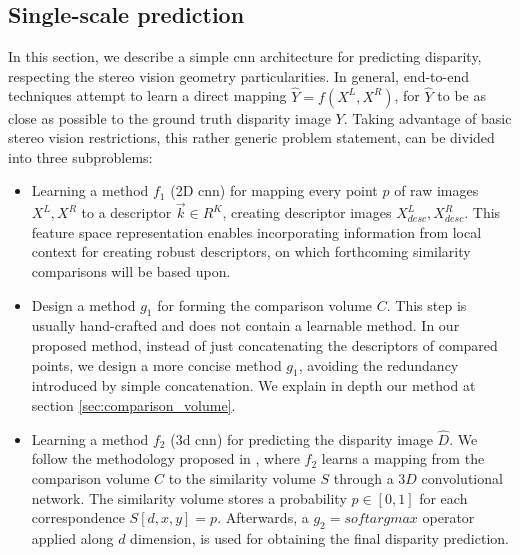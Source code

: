 \documentclass[10pt]{article}
\begin{document}
\begin{figure}[t]
\label{fig:multiscale_importance_2D}  
\vspace{-3pt}      
\end{figure}

\subsection{Single-scale prediction}

In this section, we describe a simple cnn architecture for predicting disparity, respecting the stereo vision geometry particularities. In general, end-to-end techniques attempt to learn a direct mapping $\hat{Y} = f(X^L, X^R)$, for $\hat{Y}$ to be as close as possible to the ground truth disparity image $Y$. Taking advantage of basic stereo vision restrictions, this rather generic problem statement, can be divided into three subproblems:

\begin{itemize}
    \item Learning a method $f_1$ (2D cnn) for mapping every point $p$ of raw images $X^L, X^R$ to a descriptor $\vec{k} \in R^K$, creating descriptor images $X^L_{desc}, X^R_{desc}$. This feature space representation enables incorporating information from local context for creating robust descriptors, on which forthcoming similarity comparisons will be based upon.
    
    \item Design a method $g_1$ for forming the comparison volume $C$. This step is usually hand-crafted and does not contain a learnable method. In our proposed method, instead of just concatenating the descriptors of compared points, we design a more concise method $g_1$, avoiding the redundancy introduced by simple concatenation. We explain in depth our method at section \ref{sec:comparison_volume}.
    
    \item Learning a method $f_2$ (3d cnn) for predicting the disparity image $\hat{D}$. We follow the methodology proposed in \cite{Kendall2017End-to-EndRegression}, where $f_2$ learns a mapping from the comparison volume $C$ to the similarity volume $S$ through a $3D$ convolutional network. The similarity volume stores a probability $p \in [0,1] $ for each correspondence $S[d,x,y] = p$. Afterwards, a $g_2=softargmax$ operator applied along $d$ dimension, is used for obtaining the final disparity prediction.
\end{itemize}
\end{document}
